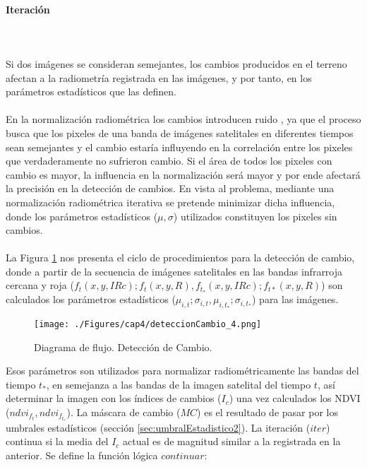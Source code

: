 \paragraph{Iteraci\'on}\label{subsec:iteracion}\mbox{}\\\mbox{}\\
 Si dos im\'agenes se consideran semejantes, los cambios producidos en el terreno afectan a la radiometr\'ia registrada en las im\'agenes, y por tanto, en los par\'ametros estad\'isticos que las definen.\\~\\
En la normalizaci\'on radiom\'etrica los cambios introducen ruido \cite{martinez2013normalizacion}, ya que el proceso busca que los pixeles de una banda de im\'agenes satelitales en diferentes tiempos sean semejantes y el cambio estar\'ia influyendo en la correlaci\'on entre los pixeles que verdaderamente no sufrieron cambio. Si el \'area de todos los pixeles con cambio es mayor, la influencia en la normalizaci\'on ser\'a mayor y por ende afectar\'a la precisi\'on en la detecci\'on de cambios. En vista al problema, mediante una normalizaci\'on radiom\'etrica iterativa se pretende minimizar dicha influencia, donde los par\'ametros estad\'isticos ($ \mu,\sigma $) utilizados constituyen los pixeles sin cambios.\\~\\	
La Figura \ref{fig:deteccionCambio} nos presenta el ciclo de procedimientos para la detecci\'on de cambio, donde a partir de la secuencia de im\'agenes satelitales en las bandas infrarroja cercana y roja ($ f_{t}(x,y,IRc);f_{t}(x,y,R), f_{t_{*}}(x,y,IRc);f_{t*}(x,y,R) $) son calculados los par\'ametros estad\'isticos ($ \mu_{i,t};\sigma_{i,t}, \mu_{i,t_{*}};\sigma_{i,t_{*}} $) para las im\'agenes.
\begin{figure}[H]
	\centering
	\texttt{[image: ./Figures/cap4/deteccionCambio\_4.png]}
	\caption{Diagrama de flujo. Detecci\'on de Cambio.}
	\label{fig:deteccionCambio}
\end{figure}
 Esos par\'ametros son utilizados para normalizar radiom\'etricamente las bandas del tiempo $ t_{*} $, en semejanza a las bandas de la imagen satelital del tiempo $ t $, as\'i determinar la imagen con los \'indices de cambios ($ I_{c} $) una vez calculados los NDVI ($ ndvi_{f_{t}},ndvi_{f_{t_{*}}} $). La m\'ascara de cambio ($ MC $) es el resultado de pasar por los umbrales estad\'isticos (secci\'on \ref{sec:umbralEstadistico2}). La iteraci\'on ($ iter $) continua si la media del $ I_{c} $ actual es de magnitud similar a la registrada en la anterior. Se define la funci\'on l\'ogica $ continuar $:
